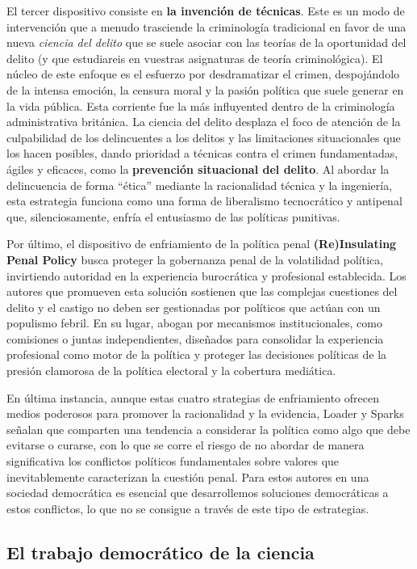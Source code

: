 \documentclass[
  spanish,
  letterpaper,
  DIV=11,
  numbers=noendperiod]{scrreprt}
\begin{document}
El tercer dispositivo consiste en \textbf{la invención de técnicas}.
Este es un modo de intervención que a menudo trasciende la criminología
tradicional en favor de una nueva \emph{ciencia del delito} que se suele
asociar con las teorías de la oportunidad del delito (y que estudiareis
en vuestras asignaturas de teoría criminológica). El núcleo de este
enfoque es el esfuerzo por desdramatizar el crimen, despojándolo de la
intensa emoción, la censura moral y la pasión política que suele generar
en la vida pública. Esta corriente fue la más influyented dentro de la
criminología administrativa británica. La ciencia del delito desplaza el
foco de atención de la culpabilidad de los delincuentes a los delitos y
las limitaciones situacionales que los hacen posibles, dando prioridad a
técnicas contra el crimen fundamentadas, ágiles y eficaces, como la
\textbf{prevención situacional del delito}. Al abordar la delincuencia
de forma ``ética'' mediante la racionalidad técnica y la ingeniería,
esta estrategia funciona como una forma de liberalismo tecnocrático y
antipenal que, silenciosamente, enfría el entusiasmo de las políticas
punitivas.

Por último, el dispositivo de enfriamiento de la política penal
\textbf{(Re)Insulating Penal Policy} busca proteger la gobernanza penal
de la volatilidad política, invirtiendo autoridad en la experiencia
burocrática y profesional establecida. Los autores que promueven esta
solución sostienen que las complejas cuestiones del delito y el castigo
no deben ser gestionadas por políticos que actúan con un populismo
febril. En su lugar, abogan por mecanismos institucionales, como
comisiones o juntas independientes, diseñados para consolidar la
experiencia profesional como motor de la política y proteger las
decisiones políticas de la presión clamorosa de la política electoral y
la cobertura mediática.

En última instancia, aunque estas cuatro strategias de enfriamiento
ofrecen medios poderosos para promover la racionalidad y la evidencia,
Loader y Sparks señalan que comparten una tendencia a considerar la
política como algo que debe evitarse o curarse, con lo que se corre el
riesgo de no abordar de manera significativa los conflictos políticos
fundamentales sobre valores que inevitablemente caracterizan la cuestión
penal. Para estos autores en una sociedad democrática es esencial que
desarrollemos soluciones democráticas a estos conflictos, lo que no se
consigue a través de este tipo de estrategias.

\subsection{El trabajo democrático de la
ciencia}\label{el-trabajo-democruxe1tico-de-la-ciencia}
\end{document}
